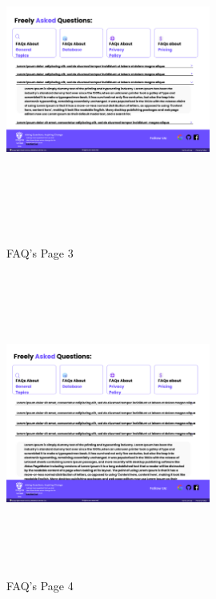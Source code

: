 \begin{figure}[H]
\includegraphics[height=10cm, width=0.6\textwidth]{./images/prototype/FAQs (2)}
\centering 
\caption{FAQ's Page 3}
\label{fig:prototype1}

\includegraphics[height=10cm, width=0.6\textwidth]{./images/prototype/FAQs (3)}
\centering 
\caption{FAQ's Page 4}
\label{fig:prototype1}

\end{figure}


